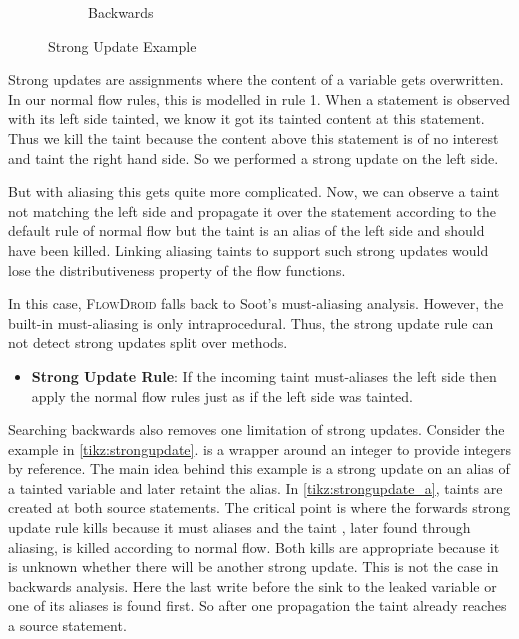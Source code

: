 \documentclass[../draft.tex]{subfiles}
\begin{document}
\begin{figure}[ht]
\begin{subfigure}[b]{0.45\textwidth}
            \caption{Backwards}
            \label{tikz:strongupdate_b}  
        \end{subfigure}
        \caption{Strong Update Example}
        \label{tikz:strongupdate}
    \end{figure}

    Strong updates are assignments where the content of a variable gets overwritten. In our normal flow rules, this is modelled in rule 1. When a statement is observed with its left side tainted, we know it got its tainted content at this statement. Thus we kill the taint because the content above this statement is of no interest and taint the right hand side. So we performed a strong update on the left side. 

    But with aliasing this gets quite more complicated. Now, we can observe a taint not matching the left side and propagate it over the statement according to the default rule of normal flow but the taint is an alias of the left side and should have been killed. Linking aliasing taints to support such strong updates would lose the distributiveness property of the flow functions. 
    
    In this case, \textsc{FlowDroid} falls back to Soot's must-aliasing analysis. However, the built-in must-aliasing is only intraprocedural. Thus, the strong update rule can not detect strong updates split over methods.

    \begin{itemize}
        \item \textbf{Strong Update Rule}: If the incoming taint must-aliases the left side then apply the normal flow rules just as if the left side was tainted. 
    \end{itemize}

    Searching backwards also removes one limitation of strong updates. Consider the example in \autoref{tikz:strongupdate}.  is a wrapper around an integer to provide integers by reference. The main idea behind this example is a strong update on an alias of a tainted variable and later retaint the alias. In \ref{tikz:strongupdate_a}, taints are created at both source statements. The critical point is  where the forwards strong update rule kills  because it must aliases  and the taint , later found through aliasing, is killed according to normal flow. Both kills are appropriate because it is unknown whether there will be another strong update. This is not the case in backwards analysis. Here the last write before the sink to the leaked variable or one of its aliases is found first. So after one propagation the taint already reaches a source statement.
\end{document}
